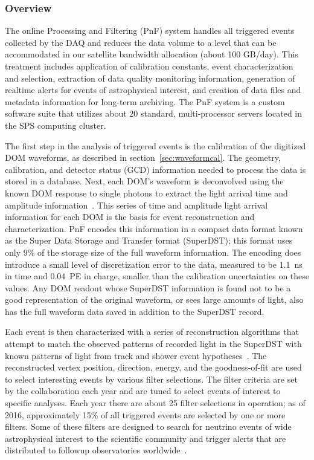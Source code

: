 \subsubsection{Overview}

The online Processing and Filtering (PnF) system handles
all triggered events collected by the DAQ
and reduces the data volume to a level that can be accommodated in our
satellite bandwidth allocation (about 100 GB/day).  This treatment
includes application of calibration constants, event
characterization and selection, extraction of data quality monitoring
information, generation of realtime alerts for events of astrophysical
interest, and creation of data files and metadata information for long-term
archiving.  The PnF system is a custom software
suite that utilizes about 20 standard, multi-processor servers located in
the SPS computing cluster.  

The first step in the analysis of triggered events is the calibration of
the digitized DOM waveforms, as described in section~\ref{sec:waveformcal}.
The geometry, calibration, and detector status (GCD) information needed to
process the data is stored in a database.  Next, each DOM's waveform is
deconvolved using the known DOM response to single photons to 
extract the light arrival time and amplitude information~\cite{IC3:ereco}.
This series of time and amplitude light arrival information for each DOM is
the basis for event reconstruction and characterization.  PnF encodes this
information in a compact data format known as the Super Data
Storage and Transfer format (SuperDST); this format uses only 9\% of the storage
size of the full waveform information.  The encoding does introduce a
small level of discretization error to the data, measured to be 1.1~ns in time and
0.04~PE in charge, smaller than the calibration uncertainties on these
values.  Any DOM readout whose SuperDST information is found not to be a
good representation of the original waveform, or sees large amounts of
light, also has the full waveform data saved in addition to the
SuperDST record.

Each event is then characterized with a series of reconstruction
algorithms that attempt to match the observed patterns of recorded light in
the SuperDST with known patterns of light from track and shower event
hypotheses~\cite{IC3:ereco}.  The reconstructed vertex position, direction,
energy, and the goodness-of-fit are used to select interesting events by various
filter selections.  The filter criteria are set by the collaboration
each year and are tuned to select events of interest to specific
analyses.  Each year there are about 25 filter selections in
operation; as of 2016, approximately 15\% of all triggered events are
selected by one or more filters.  Some of these filters are designed to search for
neutrino events of wide astrophysical interest to the scientific community
and trigger alerts that are distributed to followup observatories
worldwide~\cite{Abbasi:2011ja,Aartsen:2015trq}.

